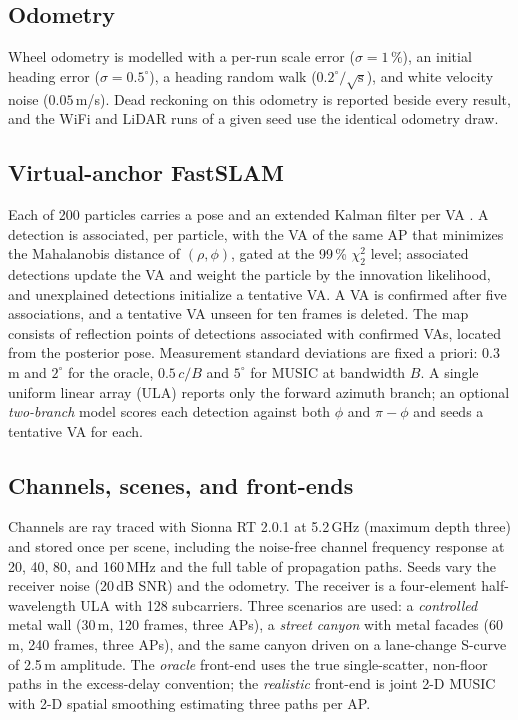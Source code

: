 \documentclass[preprint,12pt]{elsarticle}
\begin{document}
\subsection{Odometry}
Wheel odometry is modelled with a per-run scale error ($\sigma=1\,\%$), an initial heading error
($\sigma=0.5^\circ$), a heading random walk ($0.2^\circ/\sqrt{\mathrm{s}}$), and white velocity
noise ($0.05$\,m/s). Dead reckoning on this odometry is reported beside every result, and the
WiFi and LiDAR runs of a given seed use the identical odometry draw.

\subsection{Virtual-anchor FastSLAM}
Each of 200 particles carries a pose and an extended Kalman filter per VA
\cite{montemerlo2002fastslam}. A detection is associated, per particle, with the VA of the same AP
that minimizes the Mahalanobis distance of $(\rho,\phi)$, gated at the 99\,\% $\chi^2_2$ level;
associated detections update the VA and weight the particle by the innovation likelihood, and
unexplained detections initialize a tentative VA. A VA is confirmed after five associations, and
a tentative VA unseen for ten frames is deleted. The map consists of reflection points of
detections associated with confirmed VAs, located from the posterior pose. Measurement standard
deviations are fixed a priori: $0.3$\,m and $2^\circ$ for the oracle, $0.5\,c/B$ and $5^\circ$ for
MUSIC at bandwidth $B$. A single uniform linear array (ULA) reports only the forward azimuth
branch; an optional \emph{two-branch} model scores each detection against both $\phi$ and
$\pi-\phi$ and seeds a tentative VA for each.

\subsection{Channels, scenes, and front-ends}
Channels are ray traced with Sionna RT 2.0.1 \cite{hoydis2023sionnart,sionnart2026software} at 5.2\,GHz (maximum depth
three) and stored once per scene, including the noise-free channel frequency response at 20, 40,
80, and 160\,MHz and the full table of propagation paths. Seeds vary the receiver noise (20\,dB
SNR) and the odometry. The receiver is a four-element half-wavelength ULA with 128 subcarriers.
Three scenarios are used: a \emph{controlled} metal wall (30\,m, 120 frames, three APs), a
\emph{street canyon} with metal facades (60\,m, 240 frames, three APs), and the same canyon driven
on a lane-change S-curve of 2.5\,m amplitude. The \emph{oracle} front-end uses the true
single-scatter, non-floor paths in the excess-delay convention; the \emph{realistic} front-end is
joint 2-D MUSIC with 2-D spatial smoothing \cite{schmidt1986music,shan1985smoothing} estimating
three paths per AP.
\end{document}
